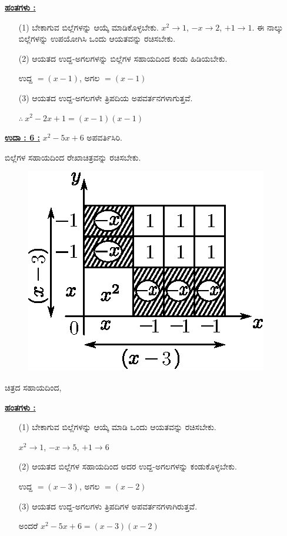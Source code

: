 \noindent
{\textbf{\underline{ಹಂತಗಳು :}}}
\begin{itemize}
\item [(1)] ಬೇಕಾಗುವ ಬಿಲ್ಲೆಗಳನ್ನು ಆಯ್ಕೆ ಮಾಡಿಕೊಳ್ಳಬೇಕು. $x^2 \rightarrow 1$, $-x \rightarrow 2$, $+1 \rightarrow 1$. ಈ ನಾಲ್ಕು ಬಿಲ್ಲೆಗಳನ್ನು ಉಪಯೋಗಿಸಿ ಒಂದು ಆಯತವನ್ನು ರಚಿಸಬೇಕು. 
\item [(2)] ಆಯತದ ಉದ್ದ-ಅಗಲಗಳನ್ನು ಬಿಲ್ಲೆಗಳ ಸಹಾಯದಿಂದ ಕಂಡು ಹಿಡಿಯಬೇಕು. 

ಉದ್ದ $= (x-1)$, ಅಗಲ $= (x-1)$

\item [(3)] ಆಯತದ ಉದ್ದ-ಅಗಲಗಳೇ ತ್ರಿಪದಿಯ ಅಪವರ್ತನಗಳಾಗುತ್ತವೆ. 

$\therefore~ x^2 - 2x + 1 = (x-1)(x-1)$
\end{itemize}

\noindent
{\textbf{\underline{ಉದಾ : 6 :}}} $x^2 - 5x + 6$ ಅಪವರ್ತಿಸಿರಿ. 

ಬಿಲ್ಲೆಗಳ ಸಹಾಯದಿಂದ ರೇಖಾಚಿತ್ರವನ್ನು ರಚಿಸಬೇಕು.
\begin{figure}[H]
\centering
\includegraphics[scale=0.8]{src/figure/chap3/fig3-44.eps}
\end{figure}
ಚಿತ್ರದ ಸಹಾಯದಿಂದ,


\noindent
{\textbf{\underline{ಹಂತಗಳು :}}}
\begin{itemize}
\item [(1)] ಬೇಕಾಗುವ ಬಿಲ್ಲೆಗಳನ್ನು ಆಯ್ಕೆ ಮಾಡಿ ಒಂದು ಆಯತವನ್ನು ರಚಿಸಬೇಕು. 

$x^2 \rightarrow 1$, $-x \rightarrow 5$, $+1 \rightarrow 6$
\item [(2)] ಆಯತದ ಬಿಲ್ಲೆಗಳ ಸಹಾಯದಿಂದ ಅದರ ಉದ್ದ-ಅಗಲಗಳನ್ನು ಕಂಡುಕೊಳ್ಳಬೇಕು. 

ಉದ್ದ $= (x-3)$, ಅಗಲ $= (x-2)$

\item [(3)] ಆಯತದ ಉದ್ದ-ಅಗಲಗಳು ತ್ರಿಪದಿಗಳ ಅಪವರ್ತನಗಳಾಗಿರುತ್ತವೆ. 

ಅಂದರೆ $x^2 - 5x + 6 = (x - 3)(x - 2)$
\end{itemize}

